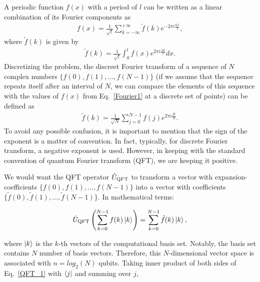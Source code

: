\documentclass[12pt,oneside]{book}
\begin{document}
A periodic function $f(x)$ with a period of $l$ can be written as a linear combination of its Fourier components as
\begin{align}\label{Fourier1}
    f(x)=\frac{1}{\sqrt{l}}\sum_{k=-\infty}^{+\infty} \tilde{f}(k) e^{-2\pi i\frac{kx}{l}},
\end{align}
where $\tilde{f}(k)$ is given by
\begin{align}
    \tilde{f}(k) = \frac{1}{\sqrt{l}}\int_0^l f(x) e^{2\pi i \frac{xk}{l}} dx.
\end{align}
Discretizing the problem, the discreet Fourier transform of a sequence of $N$ complex numbers $\{f(0),f(1),\hdots,f(N-1)\}$ (if we assume that the sequence repeats itself after an interval of $N$, we can compare the elements of this sequence with the values of $f(x)$ from Eq.~\ref{Fourier1} at a discrete set of points) can be defined as
\begin{align}\label{Fourier_tilde_expansion}
    \tilde{f}(k) = \frac{1}{\sqrt{N}} \sum_{j=0}^{N-1} f(j) e^{2\pi i \frac{jk}{N}}.
\end{align}
To avoid any possible confusion, it is important to mention that the sign of the exponent is a matter of convention. In fact, typically, for discrete Fourier transform, a negative exponent is used. However, in keeping with the standard convention of quantum Fourier transform (QFT), we are keeping it positive.

We would want the QFT operator $\hat{U}_{\rm{QFT}}$ to transform a vector with expansion-coefficients $\{f(0),f(1),\hdots,f(N-1)\}$ into a vector with coefficients $\{\tilde{f}(0),\tilde{f}(1),\hdots,\tilde{f}(N-1)\}$. In mathematical terms:

\begin{align}\label{QFT_1}
    \hat{U}_{\rm{QFT}} \left(\sum_{k=0}^{N-1} f(k)\ket{k}\right) = \sum_{k=0}^{N-1}\tilde{f}(k)\ket{k},
\end{align}

where $\ket{k}$ is the $k$-th vectors of the computational basis set. Notably, the basis set contains $N$ number of basis vectors. Therefore, this $N$-dimensional vector space is associated with $n=log_2(N)$ qubits. Taking inner product of both sides of Eq.~\ref{QFT_1} with $\bra{j}$ and summing over $j$,
\end{document}
